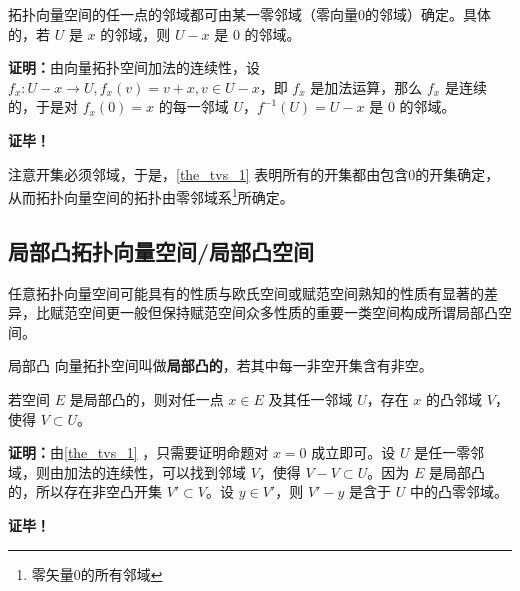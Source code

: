 \begin{theorem}{}\label{the_tvs_1}
拓扑向量空间的任一点的邻域都可由某一零邻域（零向量0的邻域）确定。具体的，若 $U$ 是 $x$ 的邻域，则 $U-x$ 是 $0$ 的邻域。
\end{theorem}

\textbf{证明：}由向量拓扑空间加法的连续性，设 $f_x:U-x\rightarrow U,f_x(v)=v+x,v\in U-x$，即 $f_x$ 是加法运算，那么 $f_x$ 是连续的，于是对 $f_x(0)=x$ 的每一邻域 $U$，$f^{-1}(U)=U-x$ 是 $0$ 的邻域。

\textbf{证毕！}

注意开集必须邻域，于是，\autoref{the_tvs_1} 表明所有的开集都由包含0的开集确定，从而拓扑向量空间的拓扑由零邻域系\footnote{零矢量0的所有邻域}所确定。


\subsection{局部凸拓扑向量空间/局部凸空间}
任意拓扑向量空间可能具有的性质与欧氏空间或赋范空间熟知的性质有显著的差异，比赋范空间更一般但保持赋范空间众多性质的重要一类空间构成所谓局部凸空间。

\begin{definition}{局部凸}
向量拓扑空间叫做\textbf{局部凸的}，若其中每一非空开集含有非空。
\end{definition}

\begin{theorem}{}
若空间 $E$ 是局部凸的，则对任一点 $x\in E$ 及其任一邻域 $U$，存在 $x$ 的凸邻域 $V$，使得 $V\subset U$。
\end{theorem}

\textbf{证明：}由\autoref{the_tvs_1} ，只需要证明命题对 $x=0$ 成立即可。设 $U$ 是任一零邻域，则由加法的连续性，可以找到邻域 $V$，使得 $V-V\subset U$。因为 $E$ 是局部凸的，所以存在非空凸开集 $V'\subset V$。设 $y\in V'$，则 $V'-y$ 是含于 $U$ 中的凸零邻域。


\textbf{证毕！}


\begin{theorem}{}



\end{theorem}







